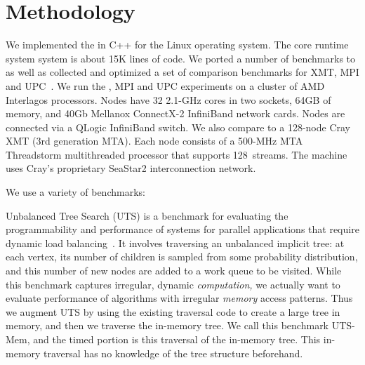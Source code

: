 \section{Methodology} \label{sec:method}

We implemented the \Grappa in C++ for the Linux operating system. The core
runtime system system is about 15K lines of code. We ported a number of
benchmarks to \Grappa as well as collected and optimized a set of comparison
benchmarks for XMT, MPI and UPC~\cite{UPC}. We run the \Grappa, MPI and UPC
experiments on a cluster of AMD Interlagos processors. Nodes have 32 2.1-GHz
cores in two sockets, 64GB of memory, and 40Gb Mellanox ConnectX-2 InfiniBand
network cards. Nodes are connected via a QLogic InfiniBand switch. We also
compare \Grappa to a 128-node Cray XMT (3rd generation MTA). Each node
consists of a 500-MHz MTA Threadstorm multithreaded processor that supports
128~streams. The machine uses Cray's proprietary SeaStar2 interconnection
network. 

We use a variety of benchmarks:

% 

\vspace{0.5ex}
 Unbalanced Tree Search
(UTS) is a benchmark for evaluating the programmability and performance of
systems for parallel applications that require dynamic load
balancing~\cite{UTS}. It involves traversing an unbalanced implicit tree: at
each vertex, its number of children is sampled from some probability
distribution, and this number of new nodes are added to a work queue to be
visited. While this benchmark captures irregular, dynamic \emph{computation,}
we actually want to evaluate performance of algorithms with irregular
\emph{memory\/} access patterns. Thus we augment UTS by using the existing
traversal code to create a large tree in memory, and then we traverse the
in-memory tree. We call this benchmark UTS-Mem, and the timed portion is this
traversal of the in-memory tree. This in-memory traversal has no knowledge of
the tree structure beforehand.

